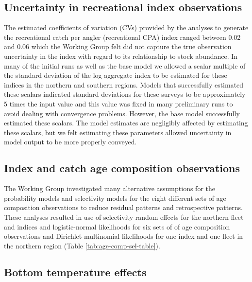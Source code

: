 \documentclass[
]{article}
\begin{document}
\hypertarget{uncertainty-in-recreational-index-observations}{%
\subsection*{Uncertainty in recreational index
observations}\label{uncertainty-in-recreational-index-observations}}

The estimated coefficients of variation (CVs) provided by the analyses
to generate the recreational catch per angler (recreational CPA) index
ranged between 0.02 and 0.06 which the Working Group felt did not
capture the true observation uncertainty in the index with regard to its
relationship to stock abundance. In many of the initial runs as well as
the base model we allowed a scalar multiple of the standard deviation of
the log aggregate index to be estimated for these indices in the
northern and southern regions. Models that successfully estimated these
scalars indicated standard deviations for these surveys to be
approximately 5 times the input value and this value was fixed in many
preliminary runs to avoid dealing with convergence problems. However,
the base model successfully estimated these scalars. The model estimates
are negligibly affected by estimating these scalars, but we felt
estimating these parameters allowed uncertainty in model output to be
more properly conveyed.

\hypertarget{index-and-catch-age-composition-observations}{%
\subsection*{Index and catch age composition
observations}\label{index-and-catch-age-composition-observations}}

The Working Group investigated many alternative assumptions for the
probability models and selectivity models for the eight different sets
of age composition observations to reduce residual patterns and
retrospective patterns. These analyses resulted in use of selectivity
random effects for the northern fleet and indices and logistic-normal
likelihoods for six sets of of age composition observations and
Dirichlet-multinomial likelihoods for one index and one fleet in the
northern region (Table \ref{tab:age-comp-sel-table}).

\hypertarget{bottom-temperature-effects}{%
\subsection*{Bottom temperature
effects}\label{bottom-temperature-effects}}
\end{document}
